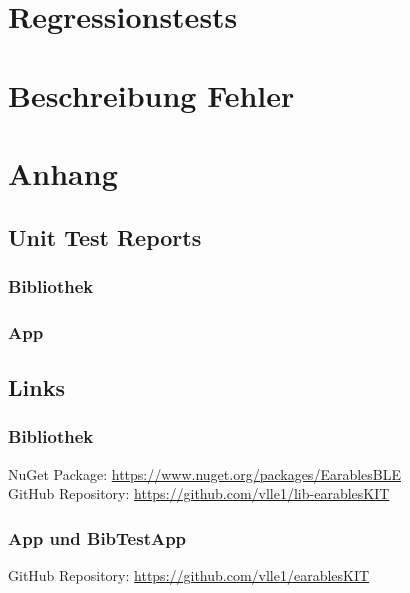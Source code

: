 \documentclass[a4paper,12pt]{article}
\begin{document}
\section{Regressionstests}

\section{Beschreibung Fehler}

\section{Anhang}
\subsection{Unit Test Reports}
\subsubsection{Bibliothek}
\subsubsection{App}

\subsection{Links}
\subsubsection{Bibliothek}
NuGet Package: \url{https://www.nuget.org/packages/EarablesBLE}\\
GitHub Repository: \url{https://github.com/vlle1/lib-earablesKIT}
\subsubsection{App und BibTestApp}
GitHub Repository: \url{https://github.com/vlle1/earablesKIT}


\printglossaries
{}
\end{document}

